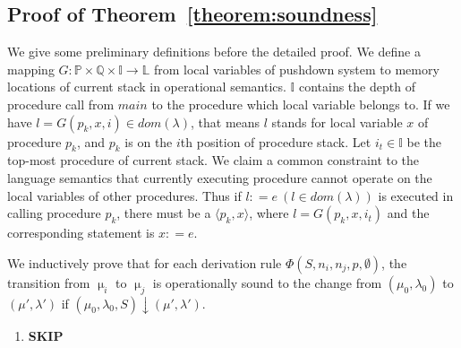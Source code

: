 \documentclass{llncs}
\begin{document}
\subsection*{Proof of Theorem~\ref{theorem:soundness}}
{\footnotesize

We give some preliminary definitions before the detailed proof. We
define a mapping $G:\mathbb{P}\times \mathbb{Q}\times \mathbb{I}
\rightarrow \mathbb{L}$ from local variables of pushdown system to
memory locations of current stack in operational semantics.
$\mathbb{I}$ contains the depth of procedure call from $main$ to the
procedure which local variable belongs to. If we have
$l=G(p_k,x,i)\in dom(\lambda)$, that means $l$ stands for local
variable $x$ of procedure $p_k$, and $p_k$ is on the $i$th position
of procedure stack. Let $i_t\in \mathbb{I}$ be the top-most
procedure of current stack. We claim a common constraint to the
language semantics that currently executing procedure cannot operate
on the local variables of other procedures. Thus if
$l\mathrel{\mathop:}= e\ (l\in dom(\lambda))$ is executed in calling
procedure $p_k$, there must be a $\langle p_k,x\rangle $, where
$l=G(p_k,x,i_t)$ and the corresponding statement is
$x\mathrel{\mathop:}= e$.

We inductively prove that for each derivation rule
$\Phi(S,n_i,n_j,p,\emptyset )$, the transition from $\upmu_i$ to
$\upmu_j$ is operationally sound to the change from
$(\mu_0,\lambda_0)$ to $(\mu',\lambda')$ if
$(\mu_0,\lambda_0,S)\downarrow (\mu',\lambda')$.

\begin{enumerate}[1.]
\item \textbf{SKIP}


\end{enumerate}}
\end{document}
